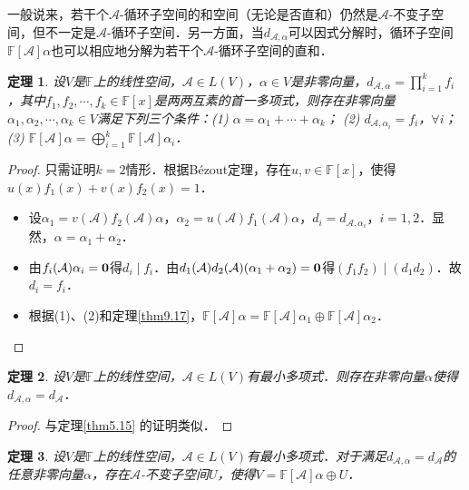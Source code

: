 \documentclass[a4paper,fontset=windows]{ctexbook}
\newtheorem{theorem}{定理}[chapter]
\theoremstyle{definition}
\begin{document}
一般说来，若干个$\mathcal{A}$-循环子空间的和空间（无论是否直和）仍然是$\mathcal{A}$-不变子空间，但不一定是$\mathcal{A}$-循环子空间．另一方面，当$d_{\mathcal{A},\alpha}$可以因式分解时，循环子空间$\mathbb{F}[\mathcal{A}]\alpha$也可以相应地分解为若干个$\mathcal{A}$-循环子空间的直和．

\begin{theorem}
设$V$是$\mathbb{F}$上的线性空间，$\mathcal{A}\in L(V)$，$\alpha\in V$是非零向量，$d_{\mathcal{A},\alpha}=\prod\limits_{i=1}^kf_i$，其中$f_1,f_2,\cdots,f_k\in\mathbb{F}[x]$是两两互素的首一多项式，则存在非零向量$\alpha_1,\alpha_2,\cdots,\alpha_k\in V$满足下列三个条件：(1) $\alpha=\alpha_1+\cdots+\alpha_k$；
(2) $d_{\mathcal{A},\alpha_i}=f_i$，$\forall i$；
(3) $\mathbb{F}[\mathcal{A}]\alpha=\bigoplus\limits_{i=1}^k\mathbb{F}[\mathcal{A}]\alpha_i$．
\end{theorem}

\begin{proof}
只需证明$k=2$情形．根据B\'ezout定理，存在$u,v\in\mathbb{F}[x]$，使得$u(x)f_1(x)+v(x)f_2(x)=1$．
\begin{itemize}
\item[(1)] 设$\alpha_1=v(\mathcal{A})f_2(\mathcal{A})\alpha$，$\alpha_2=u(\mathcal{A})f_1(\mathcal{A})\alpha$，$d_i=d_{\mathcal{A},\alpha_i}$，$i=1,2$．显然，$\alpha=\alpha_1+\alpha_2$．
\item[(2)] 由$f_i(\mathcal{A})\alpha_i={\bf 0}$得$d_i\mid f_i$．由$d_1(\mathcal{A})d_2(\mathcal{A})(\alpha_1+\alpha_2)={\bf 0}$得$(f_1f_2)\mid(d_1d_2)$．故$d_i=f_i$．
\item[(3)] 根据(1)、(2)和定理\ref{thm9.17}，$\mathbb{F}[\mathcal{A}]\alpha=\mathbb{F}[\mathcal{A}]\alpha_1\oplus\mathbb{F}[\mathcal{A}]\alpha_2$．\qedhere
\end{itemize}
\end{proof}

\begin{theorem}\label{thm9.19}
设$V$是$\mathbb{F}$上的线性空间，$\mathcal{A}\in L(V)$有最小多项式．则存在非零向量$\alpha$使得$d_{\mathcal{A},\alpha}=d_{\mathcal{A}}$．
\end{theorem}

\begin{proof}
与定理\ref{thm5.15} 的证明类似．
\end{proof}

\begin{theorem}\label{thm9.20}
设$V$是$\mathbb{F}$上的线性空间，$\mathcal{A}\in L(V)$有最小多项式．对于满足$d_{\mathcal{A},\alpha}=d_{\mathcal{A}}$的任意非零向量$\alpha$，存在$\mathcal{A}$-不变子空间$U$，使得$V=\mathbb{F}[\mathcal{A}]\alpha\oplus U$．
\end{theorem}
\end{document}
